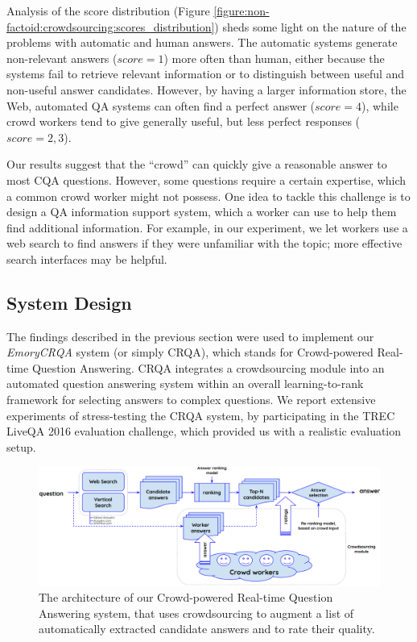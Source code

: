 Analysis of the score distribution (Figure \ref{figure:non-factoid:crowdsourcing:scores_distribution}) sheds some light on the nature of the problems with automatic and human answers.
The automatic systems generate non-relevant answers ($score=1$) more often than human, either because the systems fail to retrieve relevant information or to distinguish between useful and non-useful answer candidates.
However, by having a larger information store, \eg the Web, automated QA systems can often find a perfect answer ($score=4$), while crowd workers tend to give generally useful, but less perfect responses ($score=2,3$).

Our results suggest that the ``crowd'' can quickly give a reasonable answer to most CQA questions. However, some questions require a certain expertise, which a common crowd worker might not possess.
One idea to tackle this challenge is to design a QA information support system, which a worker can use to help them find additional information.
For example, in our experiment, we let workers use a web search to find answers if they were unfamiliar with the topic; more effective search interfaces may be helpful.

\subsection{System Design}
\label{section:crowdsourcing:approach:crqa}

The findings described in the previous section were used to implement our \textit{EmoryCRQA} system (or simply CRQA), which stands for Crowd-powered Real-time Question Answering.
CRQA integrates a crowdsourcing module into an automated question answering system within an overall learning-to-rank framework for selecting answers to complex questions.
We report extensive experiments of stress-testing the CRQA system, by participating in the TREC LiveQA 2016 evaluation challenge, which provided us with a realistic evaluation setup.

\begin{figure}
    \centering
    \includegraphics[width=\textwidth]{img/crqa_system}
    \caption{The architecture of our Crowd-powered Real-time Question Answering system, that uses crowdsourcing to augment a list of automatically extracted candidate answers and to rate their quality.}
    \label{figure:non-factoid:crowdsourcing:system}
\end{figure}

